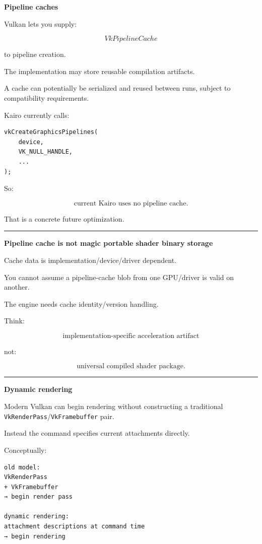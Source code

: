 \textbf{Pipeline caches}

Vulkan lets you supply:

\[
VkPipelineCache
\]

to pipeline creation.

The implementation may store reusable compilation artifacts.

A cache can potentially be serialized and reused between runs, subject to compatibility requirements.

Kairo currently calls:

\begin{verbatim}
vkCreateGraphicsPipelines(
    device,
    VK_NULL_HANDLE,
    ...
);
\end{verbatim}

So:

\[
\boxed{
\text{current Kairo uses no pipeline cache}.
}
\]

That is a concrete future optimization.

\begin{center}\rule{0.5\linewidth}{0.5pt}\end{center}

\textbf{Pipeline cache is not magic portable shader binary storage}

Cache data is implementation/device/driver dependent.

You cannot assume a pipeline-cache blob from one GPU/driver is valid on another.

The engine needs cache identity/version handling.

Think:

\[
\boxed{
\text{implementation-specific acceleration artifact}
}
\]

not:

\[
\text{universal compiled shader package}.
\]

\begin{center}\rule{0.5\linewidth}{0.5pt}\end{center}

\textbf{Dynamic rendering}

Modern Vulkan can begin rendering without constructing a traditional \texttt{VkRenderPass}/\texttt{VkFramebuffer} pair.

Instead the command specifies current attachments directly.

Conceptually:

\begin{verbatim}
old model:
VkRenderPass
+ VkFramebuffer
→ begin render pass

dynamic rendering:
attachment descriptions at command time
→ begin rendering
\end{verbatim}

